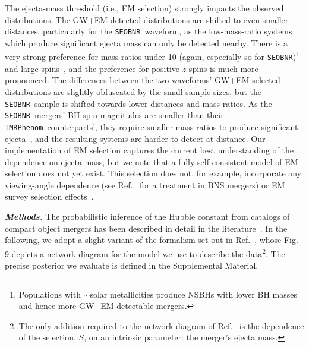 \documentclass[%
 reprint,
 superscriptaddress,
 nofootinbib,
 amsmath,amssymb,
 aps,
]{revtex4-2}
\newcommand{\seobnr}{\texttt{SEOBNR}}
\newcommand{\imrp}{\texttt{IMRPhenom}}
\begin{document}
The ejecta-mass threshold (i.e., EM selection) strongly impacts the observed distributions. The GW+EM-detected distributions are shifted to even smaller distances, particularly for the \seobnr\ waveform, as the low-mass-ratio systems which produce significant ejecta mass can only be detected nearby. There is a very strong preference for mass ratios under 10 (again, especially so for \seobnr)\footnote{Populations with $\sim$solar metallicities produce NSBHs with lower BH masses~\cite{Kruckow_etal:2018} and hence more GW+EM-detectable mergers.} and large spins~\cite{Foucart:2012,Foucart_etal:2018}, and the preference for positive $z$ spins is much more pronounced. The differences between the two waveforms' GW+EM-selected distributions are slightly obfuscated by the small sample sizes, but the \seobnr\ sample is shifted towards lower distances and mass ratios. As the \seobnr\ mergers' BH spin magnitudes are smaller than their \imrp\ counterparts', they require smaller mass ratios to produce significant ejecta~\cite{Foucart_etal:2018}, and the resulting systems are harder to detect at distance. Our implementation of EM selection captures the current best understanding of the dependence on ejecta mass, but we note that a fully self-consistent model of EM selection does not yet exist. This selection does not, for example, incorporate any viewing-angle dependence (see Ref.~\cite{Chen:2020} for a treatment in BNS mergers) or EM survey selection effects~\cite[e.g.,][]{Rosswog_etal:2017,Scolnic_etal:2018,Cowperthwaite_etal:2019,Setzer_etal:2019}.


\textbf{\emph{Methods.}} The probabilistic inference of the Hubble constant from catalogs of compact object mergers has been described in detail in the literature~\cite{Schutz:1986,Dalal:2006,Nissanke_etal:2010,Taylor_etal:2012,Nissanke_etal:2013,Abbott_etal:2017a,Chen_etal:2018,Fishbach_etal:2018,Feeney_etal:2018,Mandel_etal:2018,Gray_etal:2019,Mortlock_etal:2019,Vitale_etal:2020}. In the following, we adopt a slight variant of the formalism set out in Ref.~\cite{Mortlock_etal:2019}, whose Fig. 9 depicts a network diagram for the model we use to describe the data\footnote{The only addition required to the network diagram of Ref.~\cite{Mortlock_etal:2019} is the dependence of the selection, $S$, on an intrinsic parameter: the merger's ejecta mass.}. The precise posterior we evaluate is defined in the Supplemental Material.
\end{document}
